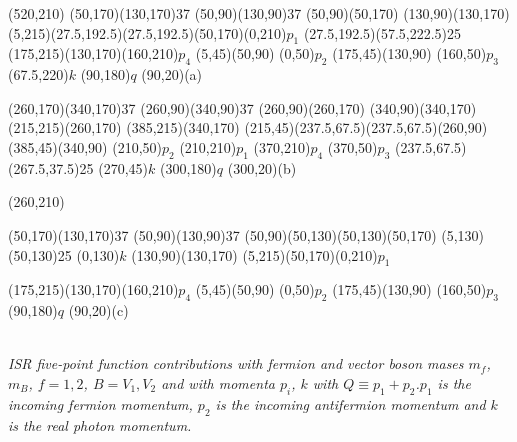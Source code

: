 \begin{center}
	\begin{axopicture}(520,210)
		\Photon(50,170)(130,170){3}{7}
		\Photon(50,90)(130,90){3}{7}
		\Line(50,90)(50,170) 
		\Line(130,90)(130,170)
		\Line[arrow](5,215)(27.5,192.5)\Line[arrow](27.5,192.5)(50,170)\Text(0,210){$p_1$}
		\Photon(27.5,192.5)(57.5,222.5){2}{5}
		\Line[arrow](175,215)(130,170)\Text(160,210){$p_4$}
		\Line[arrow](5,45)(50,90)  \Text(0,50){$p_2$} 
		\Line[arrow](175,45)(130,90) \Text(160,50){$p_3$}
		\Text(67.5,220){$k$}
		\Text(90,180){$q$}
		\Text(90,20){(a)}
		
		\Photon(260,170)(340,170){3}{7}
		\Photon(260,90)(340,90){3}{7}
		\Line(260,90)(260,170)  
		\Line(340,90)(340,170)
		\Line[arrow](215,215)(260,170)
		\Line[arrow](385,215)(340,170)
		\Line[arrow](215,45)(237.5,67.5)\Line[arrow](237.5,67.5)(260,90)
		\Line[arrow](385,45)(340,90)
		\Text(210,50){$p_2$} 
		\Text(210,210){$p_1$}
		\Text(370,210){$p_4$}
		\Text(370,50){$p_3$}
		\Photon(237.5,67.5)(267.5,37.5){2}{5}
		\Text(270,45){$k$}
		\Text(300,180){$q$}
		\Text(300,20){(b)}
	\end{axopicture}
\end{center}

\begin{center}
	\begin{axopicture}(260,210)
		
		\Photon(50,170)(130,170){3}{7}
		\Photon(50,90)(130,90){3}{7}
		\Line(50,90)(50,130)\Line(50,130)(50,170)
		\Photon(5,130)(50,130){2}{5} \Text(0,130){$k$}
		\Line(130,90)(130,170)
		\Line[arrow](5,215)(50,170)\Text(0,210){$p_1$}
		
		\Line[arrow](175,215)(130,170)\Text(160,210){$p_4$}
		\Line[arrow](5,45)(50,90)  \Text(0,50){$p_2$} 
		\Line[arrow](175,45)(130,90) \Text(160,50){$p_3$}
		\Text(90,180){$q$}
		\Text(90,20){(c)}
		
	\end{axopicture}
	\\{\sl ISR five-point function contributions with fermion and vector boson mases $m_f$, $m_B$, $f=1,2$, $B=V_1,V_2$ and with momenta $p_i$, $k$ with $Q\equiv p_1+p_2$.$p_1$ is the incoming fermion momentum, $p_2$ is the incoming antifermion momentum and $k$ is the real photon momentum.}
\end{center}



